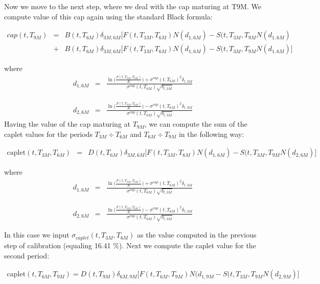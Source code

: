 \documentclass[11pt]{article}
\numberwithin{equation}{subsection}
\begin{document}
Now we move to the next step, where we deal with the cap maturing at T9M. We compute value of this cap again using the standard Black formula:

\begin{eqnarray*}
	cap(t, T_{9M}) &=& B(t, T_{6M}) \delta_{3M,6M} \big[ F(t, T_{3M}, T_{6M}) N(d_{1,6M})- S(t, T_{3M}, T_{9M}N(d_{1,6M})   \\
	&+& B(t, T_{6M}) \delta_{3M,6M} [ F(t, T_{3M}, T_{6M}) N(d_{1,6M}) - S(t, T_{3M}, T_{9M}N(d_{1,6M}) \big]
\end{eqnarray*}


where 
\begin{eqnarray*}
	d_{1,6M}&=&\frac{\ln\Big(\frac{F(t, T_{3M}, T_{6M})}{K}\Big) + \sigma^{cap}(t, T_{6M})^2\delta_{t, 3M}}{\sigma^{cap}(t, T_{6M})\sqrt{\delta_{t,3M}}}
\end{eqnarray*}

\begin{eqnarray*}
	d_{2,6M}&=&\frac{\ln\Big(\frac{F(t, T_{3M}, T_{6M})}{K}\Big) - \sigma^{cap}(t, T_{6M})^2\delta_{t, 3M}}{\sigma^{cap}(t, T_{6M})\sqrt{\delta_{t,3M}}}
\end{eqnarray*}
Having the value of the cap maturing at \(T_{9M}\), we can compute the sum of the caplet values
for the periods \(T_{3M} \div T_{6M}\) and \(T_{6M} \div T_{9M}\) in the following way:

\begin{eqnarray*}
	\text{caplet}(t, T_{3M}, T_{6M}) &=& D(t, T_{6M}) \delta_{3M,6M} \big[ F(t, T_{3M}, T_{6M}) N(d_{1,6M})
	- S(t, T_{3M}, T_{9M}N(d_{2,6M}) \big]
\end{eqnarray*}


where 
\begin{eqnarray*}
	d_{1,6M}&=&\frac{\ln\Big(\frac{F(t, T_{3M}, T_{6M})}{K}\Big) + \sigma^{cap}(t, T_{6M})^2\delta_{t, 3M}}{\sigma^{cap}(t, T_{6M})\sqrt{\delta_{t,3M}}}
\end{eqnarray*}

\begin{eqnarray*}
	d_{2,6M}&=&\frac{\ln\Big(\frac{F(t, T_{3M}, T_{6M})}{K}\Big) - \sigma^{cap}(t, T_{6M})^2\delta_{t, 3M}}{\sigma^{cap}(t, T_{6M})\sqrt{\delta_{t,3M}}}
\end{eqnarray*}


In this case we input \(\sigma_{caplet}(t, T_{3M}, T_{6M})\) as the value computed in the previous step
of calibration (equaling 16.41 \%). Next we compute the caplet value for the second
period:

\begin{eqnarray*}
	\text{caplet}(t, T_{6M}, T_{9M}) = D(t, T_{9M}) \delta_{6M,9M} \big[F(t, T_{6M}, T_{9M}) N(d_{1,9M} -  S(t, T_{3M}, T_{9M}N(d_{2,9M}) \big]
\end{eqnarray*}
\end{document}

